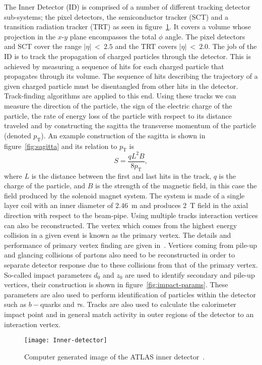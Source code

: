 The Inner Detector (ID) is comprised of a number of different tracking detector
sub-systems; the pixel detectors, the semiconductor tracker (SCT) and a
transition radiation tracker (TRT) as seen in figure~\ref{fig:ATLAS-inner-det}.
It covers a volume whose projection in the $x$-$y$ plane encompasses the total
$\phi$ angle. The pixel detectors and SCT cover the range $|\eta|~<~2.5$ and the
TRT covers $|\eta|~<~2.0$. The job of the ID is to track the propagation of
charged particles through the detector. This is achieved by measuring a sequence
of hits for each charged particle that propagates through its volume. The
sequence of hits describing the trajectory of a given charged particle must be
disentangled from other hits in the detector. Track-finding algorithms are
applied to this end. Using these tracks we can measure the direction of the
particle, the sign of the electric charge of the particle, the rate of energy
loss of the particle with respect to its distance traveled and by constructing
the sagitta the transverse momentum of the particle (denoted $p_{\mathrm{T}}$).
An example construction of the sagitta is shown in figure~\ref{fig:sagitta} and
its relation to $p_{\mathrm{T}}$ is
\begin{equation}
  \label{eq:sagitta} S = \frac{qL^{2}B}{8p_{\mathrm{T}}},
\end{equation} where $L$ is the distance between the first and last hits in the
track, $q$ is the charge of the particle, and $B$ is the strength of the
magnetic field, in this case the field produced by the solenoid magnet system.
 The system is made of a single layer coil with an
inner diameter of 2.46~m and produces 2~T field in the axial direction with
respect to the beam-pipe. Using multiple tracks interaction vertices can also be
reconstructed. The vertex which comes from the highest energy collision in a
given event is known as the primary vertex. The details and performance of
primary vertex finding are given in~\cite{primary-vertex}. Vertices coming from
pile-up and glancing collisions of partons also need to be reconstructed in
order to separate detector response due to these collisions from that of the
primary vertex.  So-called impact parameters
$d_0$ and $z_0$ are used to identify secondary and pile-up vertices, their
construction is shown in figure~\ref{fig:impact-params}. These parameters are
also used to perform identification of particles within the detector such as
$b-$quarks and $\tau$s. Tracks are also used to calculate the calorimeter impact
point and in general match activity in outer regions of the detector to an
interaction vertex.
\begin{figure}[ht] \centering
\texttt{[image: Inner-detector]}
  \caption[ATLAS inner detector]{Computer generated image of the ATLAS inner
detector~\cite{ATLAS-inner-det}.}%
  \label{fig:ATLAS-inner-det}
\end{figure}

